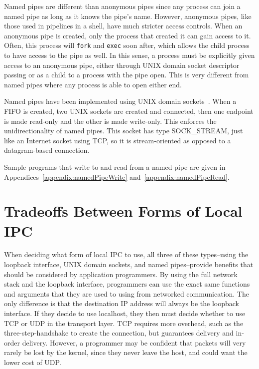 Named pipes are different than anonymous pipes since any process can join a named pipe as long as it knows the pipe's name.  However, anonymous pipes, like those used in pipelines in a shell, have much stricter access controls.  When an anonymous pipe is created, only the process that created it can gain access to it.  Often, this process will \texttt{fork} and \texttt{exec} soon after, which allows the child process to have access to the pipe as well.  In this sense, a process must be explicitly given access to an anonymous pipe, either through UNIX domain socket descriptor passing or as a child to a process with the pipe open.  This is very different from named pipes where any process is able to open either end.

Named pipes have been implemented using UNIX domain sockets~\cite[p 1147]{singh2006mac}.  When a FIFO is created, two UNIX sockets are created and connected, then one endpoint is made read-only and the other is made write-only.  This enforces the unidirectionality of named pipes.  This socket has type SOCK\_STREAM, just like an Internet socket using TCP, so it is stream-oriented as opposed to a datagram-based connection.

Sample programs that write to and read from a named pipe are given in Appendices~\ref{appendix:namedPipeWrite} and~\ref{appendix:namedPipeRead}.

\section{Tradeoffs Between Forms of Local IPC}
\label{sec:localIPCTradeoffs}
When deciding what form of local IPC to use, all three of these types--using the loopback interface, UNIX domain sockets, and named pipes--provide benefits that should be considered by application programmers.  By using the full network stack and the loopback interface, programmers can use the exact same functions and arguments that they are used to using from networked communication.  The only difference is that the destination IP address will always be the loopback interface.  If they decide to use localhost, they then must decide whether to use TCP or UDP in the transport layer.  TCP requires more overhead, such as the three-step-handshake to create the connection, but guarantees delivery and in-order delivery.  However, a programmer may be confident that packets will very rarely be lost by the kernel, since they never leave the host, and could want the lower cost of UDP.

